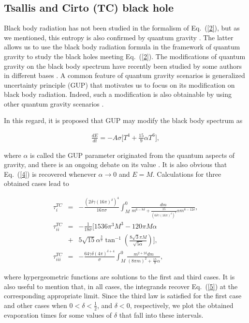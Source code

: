 \documentclass[twocolumn,preprintnumbers,amsmath,nofootinbib,amssymb]{revtex4}
\begin{document}
\subsection{Tsallis and Cirto (TC) black hole}

Black body radiation has not been studied in the formalism of
Eq.~(\ref{2}), but as we mentioned, this entropy is also confirmed
by quantum gravity \cite{barrow}. The latter allows us to use the
black body radiation formula in the framework of quantum gravity
to study the black holes meeting Eq.~(\ref{2}). The modifications
of quantum gravity on the black body spectrum have recently been
studied by some authors in different bases
\cite{nozar,hus,cqg,lobo}. A common feature of quantum gravity
scenarios is generalized uncertainty principle (GUP) that
motivates us to focus on its modification on black body radiation.
Indeed, such a modification is also obtainable by using other
quantum gravity scenarios \cite{hus,cqg}.

In this regard, it is proposed that GUP may modify the black body spectrum as \cite{cqg}

\begin{eqnarray}\label{TC1}
\frac{dE}{dt}=-A\sigma\big[T^4 +\frac{15}{9}\alpha T^6\big],
\end{eqnarray}

\noindent where $\alpha$ is called the GUP parameter originated
from the quantum aspects of gravity, and there is an ongoing
debate on its value \cite{agha,cqg}. It is also obvious that
Eq.~(\ref{4}) is recovered whenever $\alpha\rightarrow0$ and
$E=M$. Calculations for three obtained cases lead to

\begin{eqnarray}\label{TC2}
\!\!\!\!\!\!\!\tau_i^{TC}&=&-\frac{(2\delta\gamma(16\pi)^\delta)^4}{16\pi\sigma}\int_{M}^0\frac{dm}{m^{6-8\delta}+\frac{15}{(6\delta\gamma(16\pi)^\delta)^2}\alpha m^{8-12\delta}},\nonumber\\
\!\!\!\!\!\!\!\tau_{ii}^{TC}&=&-\frac{1}{18\sigma}\Big[1536\pi^3 M^3-120\pi M\alpha\nonumber\\&+&5\sqrt{15}\alpha^{\frac{3}{2}}\tan^{-1}(\frac{8\sqrt{3}\pi M}{\sqrt{5\alpha}})\Big],\nonumber\\
\!\!\!\!\!\!\!\tau_{iii}^{TC}&=&-\frac{64\gamma\delta(4\pi)^{\delta+4}}{\sigma}\int_{M}^0\frac{m^{2+2\delta}dm}{(8\pi m)^2+\frac{15}{9}\alpha},
\end{eqnarray}

\noindent where hypergeometric functions are solutions to the
first and third cases. It is also useful to mention that, in all
cases, the integrands recover Eq.~(\ref{5}) at the corresponding
appropriate limit. Since the third law is satisfied for the first
case and other cases when $0<\delta<\frac{1}{2}$, and $\delta<0$,
respectively, we plot the obtained evaporation times for some
values of $\delta$ that fall into these intervals.
\end{document}
